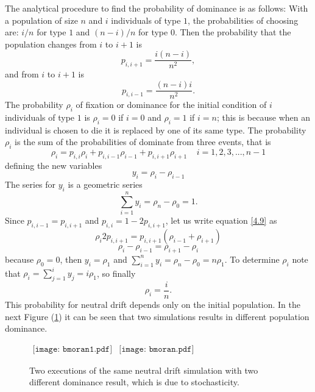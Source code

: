 The analytical procedure to find the probability of dominance is as follows: With a population of size $n$ and $i$ individuals of type $1$, the probabilities of choosing are: $i/n$ for type $1$ and $(n-i)/n$ for type $0$. Then the probability  that the population changes from $i$  to $i+1$ is 
\begin{equation}
p_{i,i+1}=\frac{i(n-i)}{n^2},
\end{equation}   
and from $i$ to $i+1$ is
\begin{equation}
p_{i,i-1}=\frac{(n-i)i}{n^2}.
\end{equation}
 The probability $\rho_i$ of fixation or dominance for the initial condition of $i$ individuals of type $1$ is $\rho_i=0$ if $i=0$ and $\rho_i=1$ if $i=n$; this is because  when an individual is chosen to die it is replaced by one of its same type. The probability $\rho_i$ is the sum of the probabilities of dominate from three events, that is
 \begin{equation}\label{4.9}
 \rho_i=p_{i,i}\rho_i + p_{i,i-1}\rho_{i-1} + p_{i,i+1}\rho_{i+1} \;\;\;\; i=1, 2, 3, ..., n-1
 \end{equation}  
 defining the new variables
 \begin{equation}
 y_i= \rho_{i}-\rho_{i-1}
  \end{equation}
  The series for $y_i$ is a geometric series
\begin{equation}
\sum_{i=1}^{n}y_i=\rho_{n}-\rho_{0}=1.
\end{equation} 
Since $p_{i,i-1}=p_{i,i+1}$ and $p_{i,i}=1-2p_{i,i+1}$, let us write equation \eqref{4.9} as
\begin{equation}
\rho_{i}2p_{i,i+1}=p_{i,i+1}(\rho_{i-1}+\rho_{i+1})
\end{equation}
\begin{equation}
\rho_{i}-\rho_{i-1}=\rho_{i+1}-\rho_{i}
\end{equation}
because $\rho_0 = 0$, then $y_i=\rho_1$ and $\sum_{i=1}^{n}y_i=\rho_{n}-\rho_{0}=n\rho_{1}$. To determine $\rho_i$ note that $\rho_i = \sum_{j=1}^{i}y_j =i\rho_1$, so finally
\begin{equation}
\rho_{i}=\frac{i}{n}.
\end{equation} 
This probability for neutral drift depends only on the initial population.
In the next Figure (\ref{Fig46}) it can be seen  that two simulations results in different population dominance.
\begin{figure}[H]
\begin{center}$
\begin{array}{cc}
\texttt{[image: bmoran1.pdf]} &
\texttt{[image: bmoran.pdf]}
\end{array}$
\end{center}
\caption{Two executions of the same neutral drift simulation with two different dominance result, which is due to stochasticity.}
\label{Fig46}
\end{figure}

